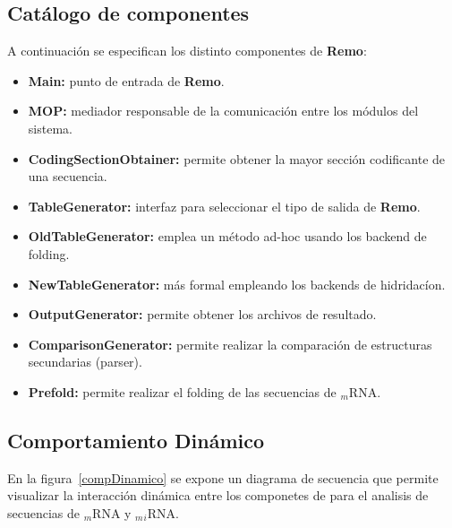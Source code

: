 \subsection{Catálogo de componentes}
\par A continuación se especifican los distinto componentes de \textbf{Remo}:

\begin{itemize}
	\item \textbf{Main:} punto de entrada de \textbf{Remo}.
	\item \textbf{MOP:} mediador responsable de la comunicación entre los módulos del sistema.

	\item \textbf{CodingSectionObtainer:} permite obtener la mayor sección codificante de una secuencia.

	\item \textbf{TableGenerator:} interfaz para seleccionar el tipo de salida de \textbf{Remo}.

	\item \textbf{OldTableGenerator:} emplea un método ad-hoc usando los backend de folding.

	\item \textbf{NewTableGenerator:} más formal empleando los backends de hidridacíon.

	\item \textbf{OutputGenerator:} permite obtener los archivos de resultado.

	\item \textbf{ComparisonGenerator:} permite realizar la comparación de estructuras secundarias (parser).

	\item \textbf{Prefold:} permite realizar el folding de las secuencias de $_m$RNA. 
\end{itemize}

\subsection{Comportamiento Dinámico}
En la figura~\ref{compDinamico} se expone un diagrama de secuencia que permite visualizar la interacción dinámica entre los componetes de \remo para el analisis de secuencias de $_m$RNA y $_m$$_i$RNA.


